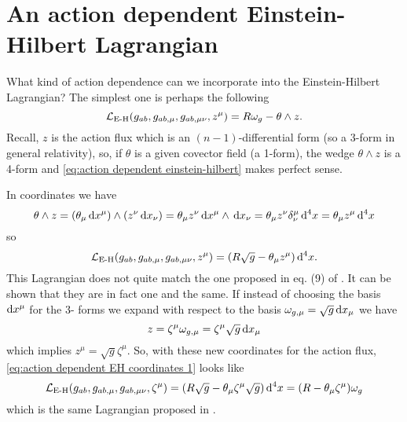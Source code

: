 \documentclass[../main.tex]{subfiles}
\begin{document}
\section{An action dependent Einstein-Hilbert Lagrangian}
What kind of action dependence can we incorporate into the Einstein-Hilbert Lagrangian?
The simplest one is perhaps the following
\begin{equation} \label{eq:action dependent einstein-hilbert}
	\mathcal{L}_{\text{E-H}}(g_{ab}, g_{ab,\mu}, g_{ab,\mu\nu}, z^\mu) = R\omega_g - \theta \wedge z. 
\end{equation}
Recall, \( z \) is the action flux which is an \( (n-1) \)-differential form (so a 3-form
in general relativity), so, if \( \theta \) is a given covector field (a 1-form), the wedge \(
\theta \wedge z \) is a 4-form and \cref{eq:action dependent einstein-hilbert} makes
perfect sense. 

In coordinates we have
\begin{equation*}
	\theta \wedge z = (\theta_\mu \,\mathrm{d} x^\mu) \wedge (z^\nu \,\mathrm{d} x_\nu) = \theta_\mu z^\nu \,\mathrm{d}
	x^\mu \wedge \,\mathrm{d} x_\nu = \theta_\mu z^\nu \delta^\mu_\nu \,\mathrm{d}^4 x = \theta_\mu z^\mu
	\,\mathrm{d}^4x
\end{equation*}
so
\begin{equation}\label{eq:action dependent EH coordinates 1}
	\mathcal{L}_{\text{E-H}}(g_{ab}, g_{ab,\mu}, g_{ab,\mu\nu}, z^\mu) = (R\sqrt{g} - \theta_\mu
	z^\mu) \,\mathrm{d}^4 x. 
\end{equation}
This Lagrangian does not quite match the one proposed in eq. (9) of \cite{Lazo2017}. It
can be shown that they are in fact one and the same. If instead of choosing the basis \(
\mathrm{d} x^\mu \) for the 3- forms we expand with respect to the basis \( \omega_{g,\mu} = \sqrt{g}
\,\mathrm{d} x_\mu \) we have
\begin{equation*}
	z = \zeta^\mu \omega_{g,\mu} = \zeta^\mu \sqrt{g} \,\mathrm{d} x_\mu
\end{equation*}
which implies \( z^\mu = \sqrt{g} \zeta^\mu \). So, with these new coordinates for the
action flux, \cref{eq:action dependent EH coordinates 1} looks like
\begin{equation}\label{eq:action dependent EH coordinates 2}
	\mathcal{L}_{\text{E-H}}(g_{ab}, g_{ab,\mu}, g_{ab,\mu\nu}, \zeta^\mu) = (R\sqrt{g} - \theta_\mu
	\zeta^\mu \sqrt{g}) \,\mathrm{d}^4 x = (R - \theta_\mu \zeta^\mu)\omega_g
\end{equation}
which is the same Lagrangian proposed in \cite{Lazo2017}. 
\end{document}
